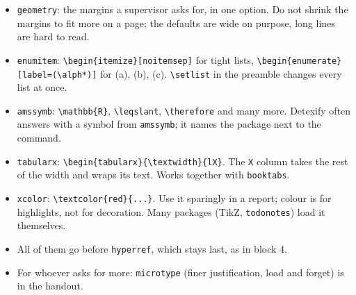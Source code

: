 \begin{frame}[fragile]
{\begin{itemize}
                For English: \texttt{english} or \texttt{british}.
                \texttt{nswissgerman} also exists, for Swiss conventions.
            \item \texttt{geometry}: the margins a supervisor asks for, in one option.
                Do not shrink the margins to fit more on a page;
                the defaults are wide on purpose, long lines are hard to read.
            \item \texttt{enumitem}: \texttt{\textbackslash begin\{itemize\}[noitemsep]} for tight lists,
                \texttt{\textbackslash begin\{enumerate\}[label=(\textbackslash alph*)]} for (a), (b), (c).
                \texttt{\textbackslash setlist} in the preamble changes every list at once.
            \item \texttt{amssymb}: \texttt{\textbackslash mathbb\{R\}}, \texttt{\textbackslash leqslant}, \texttt{\textbackslash therefore} and many more.
                Detexify often answers with a symbol from \texttt{amssymb}; it names the package next to the command.
            \item \texttt{tabularx}: \texttt{\textbackslash begin\{tabularx\}\{\textbackslash textwidth\}\{lX\}}.
                The \texttt{X} column takes the rest of the width and wraps its text.
                Works together with \texttt{booktabs}.
            \item \texttt{xcolor}: \texttt{\textbackslash textcolor\{red\}\{...\}}.
                Use it sparingly in a report; colour is for highlights, not for decoration.
                Many packages (TikZ, \texttt{todonotes}) load it themselves.
            \item All of them go before \texttt{hyperref}, which stays last, as in block 4.
            \item For whoever asks for more: \texttt{microtype} (finer justification, load and forget)
                is in the handout.
        \end{itemize}
    }
\end{frame}


